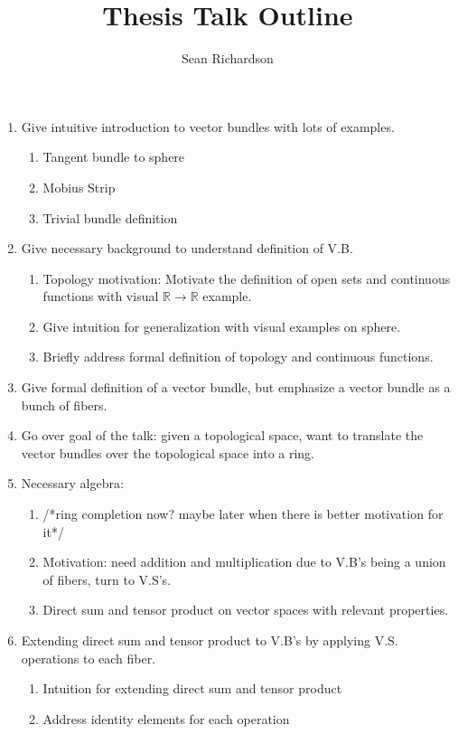 \documentclass[leqno]{amsart}
\theoremstyle{definition}
\newcommand{\toadd}[1]{/*#1*/}
\newcommand{\R}{\mathbb{R}}
\begin{document}
	\title{Thesis Talk Outline}
	\author{Sean Richardson}
	\maketitle
	\begin{enumerate}
		\item Give intuitive introduction to vector bundles with lots of examples.
			\begin{enumerate}
				\item Tangent bundle to sphere
				\item Mobius Strip
				\item Trivial bundle definition
			\end{enumerate}
		\item Give necessary background to understand definition of V.B.
			\begin{enumerate}
				\item Topology motivation: Motivate the definition of open sets and continuous functions with visual $\R \to \R$ example.
				\item Give intuition for generalization with visual examples on sphere.
				\item Briefly address formal definition of topology and continuous functions.
			\end{enumerate}
		\item Give formal definition of a vector bundle, but emphasize a vector bundle as a bunch of fibers.
		\item Go over goal of the talk: given a topological space, want to translate the vector bundles over the topological space into a ring.
		\item Necessary algebra: 
			\begin{enumerate}
				\item \toadd{ring completion now? maybe later when there is better motivation for it}
				\item Motivation: need addition and multiplication due to V.B's being a union of fibers, turn to V.S's.
				\item Direct sum and tensor product on vector spaces with relevant properties.
			\end{enumerate}
		\item Extending direct sum and tensor product to V.B's by applying V.S. operations to each fiber.
			\begin{enumerate}
				\item Intuition for extending direct sum and tensor product
				\item Address identity elements for each operation

\end{enumerate}
\end{enumerate}
\end{document}
